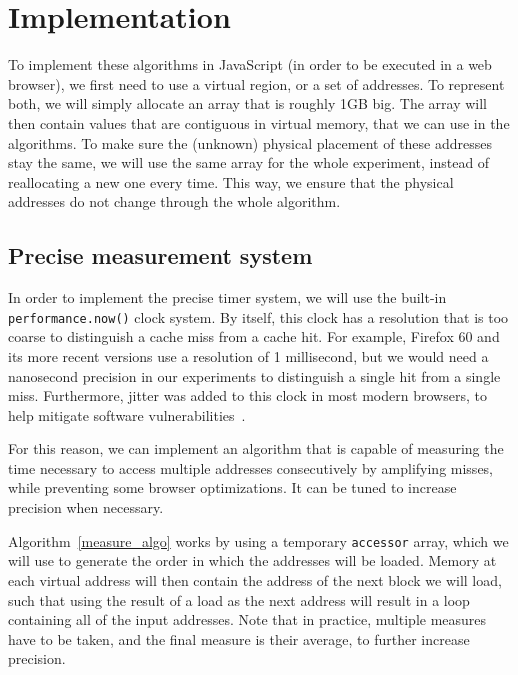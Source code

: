 \documentclass[a4paper,11pt,oneside]{report}
\begin{document}
\chapter{Implementation}



To implement these algorithms in JavaScript (in order to be executed in a web browser), we first need to use a virtual region, or a set of addresses. To represent both, we will simply allocate an array that is roughly 1GB big. The array will then contain values that are contiguous in virtual memory, that we can use in the algorithms. To make sure the (unknown) physical placement of these addresses stay the same, we will use the same array for the whole experiment, instead of reallocating a new one every time. This way, we ensure that the physical addresses do not change through the whole algorithm.

\section{Precise measurement system}

In order to implement the precise timer system, we will use the built-in \texttt{performance.now()} clock system. By itself, this clock has a resolution that is too coarse to distinguish a cache miss from a cache hit. For example, Firefox 60 and its more recent versions use a resolution of 1 millisecond, but we would need a nanosecond precision in our experiments to distinguish a single hit from a single miss. Furthermore, jitter was added to this clock in most modern browsers, to help mitigate software vulnerabilities~\cite{aleph_spectre}. 

For this reason, we can implement an algorithm that is capable of measuring the time necessary to access multiple addresses consecutively by amplifying misses, while preventing some browser optimizations. It can be tuned to increase precision when necessary.

Algorithm~\ref{measure_algo} works by using a temporary \texttt{accessor} array, which we will use to generate the order in which the addresses will be loaded. Memory at each virtual address will then contain the address of the next block we will load, such that using the result of a load as the next address will result in a loop containing all of the input addresses. Note that in practice, multiple measures have to be taken, and the final measure is their average, to further increase precision. 
\end{document}
